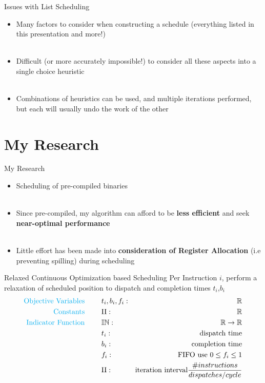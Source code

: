 \documentclass{beamer}
\begin{document}
\begin{darkframes}
\begin{frame}{Issues with List Scheduling}
    \begin{itemize}
        \item Many factors to consider when constructing a schedule (everything listed in this presentation and more!) \\
        \qquad \\
        \pause
        \item Difficult (or more accurately impossible!) to consider all these aspects into a single choice heuristic \\
        \qquad \\
        \pause
        \item Combinations of heuristics can be used, and multiple iterations performed, but each will usually undo the work of the other
    \end{itemize}
\end{frame}

\section{My Research}
\begin{frame}{My Research}

    \begin{itemize}
        \item Scheduling of pre-compiled binaries \\
        \qquad \\
        \pause
        \item Since pre-compiled, my algorithm can afford to be {\bf \color{green} less efficient} and seek {\bf \color{green} near-optimal performance} \\
        \qquad \\
        \pause
        \item Little effort has been made into {\bf \color{green} consideration of Register Allocation} (i.e preventing spilling) during scheduling
    \end{itemize}
\end{frame}

\begin{frame}{Relaxed Continuous Optimization based Scheduling}
    Per Instruction $i$, perform a relaxation of scheduled position to dispatch and completion times $t_i$,$b_i$
    \begin{align*}
    \text{\color{cyan} Objective Variables \qquad} & t_i, b_i, f_i:& \mathbb{R} \\
    \text{\color{cyan} Constants \qquad} & \textrm{II} :& \mathbb{R} \\
    \text{\color{cyan} Indicator Function \qquad} & \mathbb{IN} :& \mathbb{R} \rightarrow \mathbb{R} \\
    & t_i :& \text{dispatch time} \\
    & b_i :& \text{completion time} \\
    & f_i :& \text{FIFO use } 0 \leq f_i \leq 1 \\
    & \textrm{II} :& \text{iteration interval} \frac{\# instructions}{dispatches/cycle} \\
    \end{align*}
   

\end{frame}
\end{darkframes}
\end{document}
